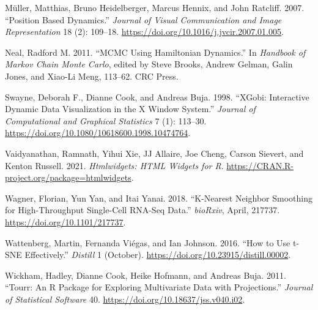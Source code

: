 \begin{CSLReferences}{1}{0}
\leavevmode{}%
Müller, Matthias, Bruno Heidelberger, Marcus Hennix, and John Ratcliff. 2007. {``Position Based Dynamics.''} \emph{Journal of Visual Communication and Image Representation} 18 (2): 109--18. \url{https://doi.org/10.1016/j.jvcir.2007.01.005}.

\leavevmode{}%
Neal, Radford M. 2011. {``{MCMC} Using {Hamiltonian Dynamics}.''} In \emph{Handbook of {Markov Chain Monte Carlo}}, edited by Steve Brooks, Andrew Gelman, Galin Jones, and Xiao-Li Meng, 113--62. CRC Press.

\leavevmode{}%
Swayne, Deborah F., Dianne Cook, and Andreas Buja. 1998. {``{XGobi}: Interactive Dynamic Data Visualization in the {X Window System}.''} \emph{Journal of Computational and Graphical Statistics} 7 (1): 113--30. \url{https://doi.org/10.1080/10618600.1998.10474764}.

\leavevmode{}%
Vaidyanathan, Ramnath, Yihui Xie, JJ Allaire, Joe Cheng, Carson Sievert, and Kenton Russell. 2021. \emph{Htmlwidgets: {HTML} Widgets for {R}}. \url{https://CRAN.R-project.org/package=htmlwidgets}.

\leavevmode{}%
Wagner, Florian, Yun Yan, and Itai Yanai. 2018. {``K-Nearest Neighbor Smoothing for High-Throughput Single-Cell {RNA-Seq} Data.''} \emph{bioRxiv}, April, 217737. \url{https://doi.org/10.1101/217737}.

\leavevmode{}%
Wattenberg, Martin, Fernanda Viégas, and Ian Johnson. 2016. {``How to Use {t-SNE} Effectively.''} \emph{Distill} 1 (October). \url{https://doi.org/10.23915/distill.00002}.

\leavevmode{}%
Wickham, Hadley, Dianne Cook, Heike Hofmann, and Andreas Buja. 2011. {``Tourr: An {R} Package for Exploring Multivariate Data with Projections.''} \emph{Journal of Statistical Software} 40. \url{https://doi.org/10.18637/jss.v040.i02}.

\end{CSLReferences}



\address{%
Paul Harrison\\
Monash Genomics and Bioinformatics Platform, Monash University\\%
15 Innovation Walk\\ Monash University, Clayton Campus\\ Clayton VIC, Australia, 3800\\
%
\url{https://logarithmic.net/pfh/}\\%
\textit{ORCiD: \href{https://orcid.org/0000-0002-3980-268X}{0000-0002-3980-268X}}\\%
\href{mailto:paul.harrison@monash.edu}{\nolinkurl{paul.harrison@monash.edu}}%
}
